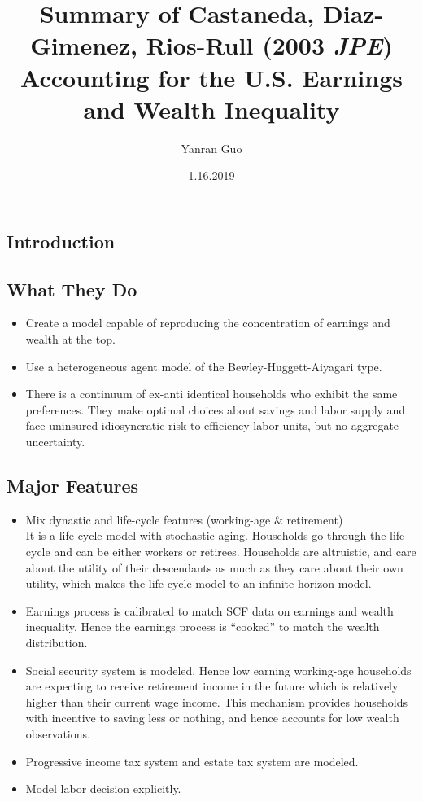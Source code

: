 \documentclass{article}
\title{Summary of Castaneda, Diaz-Gimenez, Rios-Rull (2003 \textit{JPE})\\
Accounting for the U.S. Earnings and Wealth Inequality\\}
\author{Yanran Guo}
\date{1.16.2019}
\begin{document}
\begin{spacing}{1.5}
\maketitle
\thispagestyle{fancy}


\section{Introduction}
\setlength{\parindent}{2em}
\subsection{What They Do}
\begin{itemize}
\item Create a model capable of reproducing the concentration of earnings and wealth at the top.
\item Use a heterogeneous agent model of the Bewley-Huggett-Aiyagari type.
\item There is a continuum of ex-anti identical households who exhibit the same preferences. They make optimal choices about savings and labor supply and face uninsured idiosyncratic risk to efficiency labor units, but no aggregate uncertainty.\\
\end{itemize}


\subsection{Major Features}
\begin{itemize}
\item Mix dynastic and life-cycle features (working-age $\&$ retirement)\\
It is a life-cycle model with stochastic aging. Households go through the life cycle and can be either workers or retirees. Households are altruistic, and care about the utility of their descendants as much as they care about their own utility, which makes the life-cycle model to an infinite horizon model.
\item Earnings process is calibrated to match SCF data on earnings and wealth inequality. Hence the earnings process is ``cooked'' to match the wealth distribution.
\item Social security system is modeled. Hence low earning working-age households are expecting to receive retirement income in the future which is relatively higher than their current wage income. This mechanism provides households with incentive to saving less or nothing, and hence accounts for low wealth observations.
\item Progressive income tax system and estate tax system are modeled.
\item Model labor decision explicitly.\\
\end{itemize}




\end{spacing}
\end{document}
